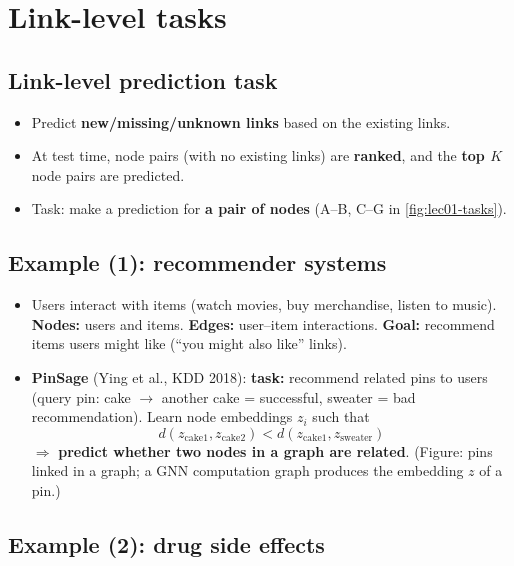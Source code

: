\section{Link-level tasks}\label{sec:lec01-link}

\subsection{Link-level prediction task}\label{sec:lec01-linkpred}

\begin{itemize}
  \item Predict \textbf{new/missing/unknown links} based on the existing links.
  \item At test time, node pairs (with no existing links) are \textbf{ranked}, and the
    \textbf{top $K$} node pairs are predicted.
  \item Task: make a prediction for \textbf{a pair of nodes} (A--B, C--G in
    \cref{fig:lec01-tasks}).
\end{itemize}

\subsection{Example (1): recommender systems}\label{sec:lec01-recsys}

\begin{itemize}
  \item Users interact with items (watch movies, buy merchandise, listen to music).
    \textbf{Nodes:} users and items. \textbf{Edges:} user--item interactions.
    \textbf{Goal:} recommend items users might like (``you might also like'' links).
  \item \textbf{PinSage} (Ying et al., KDD 2018): \textbf{task:} recommend related pins to
    users (query pin: cake $\to$ another cake = successful, sweater = bad recommendation).
    Learn node embeddings $z_i$ such that
    \begin{equation}\label{eq:lec01-pinsage}
      d(z_{\text{cake1}}, z_{\text{cake2}}) < d(z_{\text{cake1}}, z_{\text{sweater}})
    \end{equation}
    $\Rightarrow$ \textbf{predict whether two nodes in a graph are related}. (Figure: pins
    linked in a graph; a GNN computation graph produces the embedding $z$ of a pin.)
\end{itemize}

\subsection{Example (2): drug side effects}\label{sec:lec01-polypharmacy}

